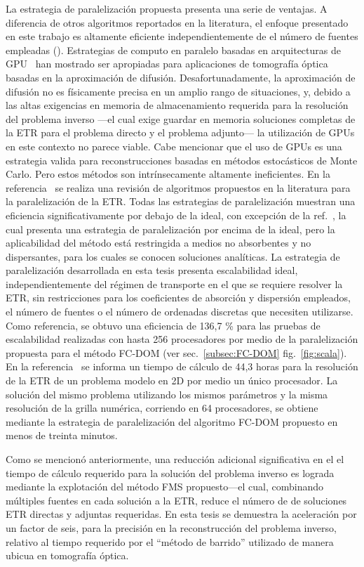 La estrategia de paralelización propuesta presenta una serie de
ventajas. A diferencia de otros algoritmos reportados en la literatura, el enfoque
presentado en este trabajo es altamente eficiente independientemente de
el número de fuentes empleadas (\cf \cite{Hielscher2004}).
Estrategias de computo en paralelo basadas en arquitecturas de GPU~\cite {Doulgerakis2017} han mostrado ser apropiadas para aplicaciones de tomografía óptica basadas en la aproximación de difusión. Desafortunadamente, 
la aproximación de difusión no es físicamente precisa en un amplio rango de situaciones,
y, debido a las altas exigencias en memoria de almacenamiento requerida para 
la resolución del problema inverso ---el cual exige guardar en memoria soluciones completas 
de la ETR para el problema 
directo y el problema adjunto--- la utilización de GPUs en este contexto no parece viable. 
Cabe mencionar que el uso de GPUs es una estrategia valida para reconstrucciones 
basadas en métodos estocásticos de Monte Carlo. Pero estos métodos son intrínsecamente 
altamente ineficientes. En la 
referencia~\cite{Coelho2014} se realiza una revisión de algoritmos propuestos en la literatura 
para la paralelización de la ETR. Todas las estrategias de paralelización muestran una eficiencia significativamente por debajo de la ideal, con excepción de la ref.~\cite {Colomer2013}, la cual presenta una estrategia de paralelización 
por encima de la ideal, pero
la aplicabilidad del método está restringida a medios no absorbentes y no dispersantes, 
para los cuales se conocen soluciones analíticas. La estrategia de paralelización 
desarrollada en esta tesis presenta escalabilidad ideal, independientemente 
del régimen de transporte en el que se requiere resolver la ETR, sin restricciones 
para los coeficientes de absorción y dispersión empleados, el número de fuentes o el número de ordenadas discretas que necesiten utilizarse. Como referencia, se obtuvo una eficiencia de 136,7 \% para las pruebas de escalabilidad realizadas con hasta 256 procesadores por
medio de la paralelización propuesta para el método FC-DOM (ver sec.~\ref{subsec:FC-DOM} fig.~\ref{fig:scala}). En la referencia~\cite [p. 153]{Fujii2014} 
se informa un tiempo de cálculo de 44,3 horas para la resolución de la ETR de un problema modelo 
en 2D por medio un único procesador. La solución del mismo problema utilizando 
los mismos parámetros y la misma resolución de la grilla numérica, corriendo en 64 procesadores, se obtiene mediante la estrategia de paralelización del algoritmo FC-DOM propuesto en menos de treinta minutos.

Como se mencionó anteriormente, una reducción adicional significativa en el
el tiempo de cálculo requerido para la solución del problema inverso es
lograda mediante la explotación del método FMS propuesto---el cual, combinando
múltiples fuentes en cada solución a la ETR, reduce el número de
de soluciones ETR directas y adjuntas requeridas. 
En esta tesis se demuestra la aceleración por un factor de seis, 
para la precisión en la reconstrucción del problema inverso,
relativo al tiempo requerido por el ``método de barrido'' 
utilizado de manera ubicua en tomografía óptica.


\pagestyle{empty}

